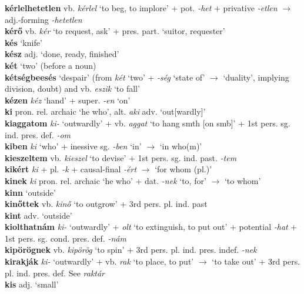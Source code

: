 \documentclass[11pt]{article}
\begin{document}
\textbf{kérlelhetetlen} vb. \emph{kérlel} `to beg, to implore' +
pot. \emph{-het} + privative \emph{-etlen} $\rightarrow$
adj.\hyp{}forming \emph{-hetetlen} \\
\textbf{kérő} vb. \emph{kér} `to request, ask' +
pres. part. \textbar\textbar{} `suitor, requester' \\
\textbf{kés} `knife' \\
\textbf{kész} adj. `done, ready, finished' \\
\textbf{két} `two' (before a noun) \\
\textbf{kétségbeesés} `despair' (from \emph{két} `two' + \emph{-ség}
`state of' $\rightarrow$ `duality', implying division, doubt) and
vb. \emph{eszik} `to fall' \\
\textbf{kézen} \emph{kéz} `hand' + super. \emph{-en} `on' \\
\textbf{ki} pron. rel. archaic `he who',
alt. \emph{aki} \textbar\textbar{} adv. `out[wardly]' \\
\textbf{kiaggatom} \emph{ki-} `outwardly' + vb. \emph{aggat}
`to hang smth [on smb]' + 1st pers. sg. ind. pres. def. \emph{-om} \\
\textbf{kiben} \emph{ki} `who' +
inessive sg. \emph{-ben} `in' $\rightarrow$ `in who(m)' \\
\textbf{kieszeltem} vb. \emph{kieszel} `to devise' + 1st
pers. sg. ind. past. \emph{-tem} \\
\textbf{kikért} \emph{ki} + pl. \emph{-k} +
causal\hyp{}final \emph{-ért} $\rightarrow$ `for whom (pl.)' \\
\textbf{kinek} \emph{ki} pron. rel. archaic `he who' + dat. \emph{-nek} `to,
for' $\rightarrow$ `to whom' \\
\textbf{kinn} `outside' \\
\textbf{kinőttek} vb. \emph{kinő} `to outgrow' + 3rd
pers. pl. ind. past \\
\textbf{kint} adv. `outside' \\
\textbf{kiolthatnám} \emph{ki-} `outwardly' + \emph{olt} `to
extinguish, to put out' + potential \emph{-hat} + 1st
pers. sg. cond. pres. def. \emph{-nám} \\
\textbf{kipörögnek} vb. \emph{kipörög} `to spin' + 3rd
  pers. pl. ind. pres. indef. \emph{-nek} \\
\textbf{kirakják} \emph{ki-} `outwardly' + vb. \emph{rak}
`to place, to put' $\rightarrow$ `to take out' + 3rd
 pers. pl. ind. pres. def. See \emph{raktár} \\
\textbf{kis} adj. `small' \\
\end{document}
